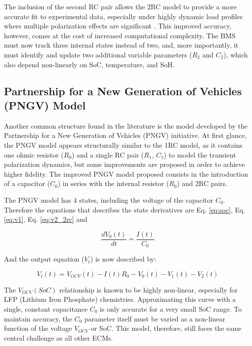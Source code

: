 \documentclass[lettersize,journal]{IEEEtran}
\begin{document}
The inclusion of the second RC pair allows the 2RC model to provide a more accurate fit to experimental data, especially under highly dynamic load profiles where multiple polarization effects are significant \cite{khalfi2021electric}. This improved accuracy, however, comes at the cost of increased computational complexity. The BMS must now track three internal states instead of two, and, more importantly, it must identify and update two additional variable parameters ($R_2$ and $C_2$), which also depend non-linearly on SoC, temperature, and SoH.

\subsection{Partnership for a New Generation of Vehicles (PNGV) Model}

Another common structure found in the literature is the model developed by the Partnership for a New Generation of Vehicles (PNGV) initiative\cite{tekin2024comparative}. At first glance, the PNGV model appears structurally similar to the 1RC model, as it contains one ohmic resistor ($R_0$) and a single RC pair ($R_1$, $C_1$) to model the transient polarization dynamics, but some improvements are proposed in order to achieve higher fidelity\cite{Tao2023,Xinyu2025}. The improved PNGV model proposed consists in the introduction of a capacitor ($C_0$) in series with the internal resistor ($R_0$) and 2RC pairs. 

The PNGV model has 4 states, including the voltage of the capacitor $C_0$. Therefore the equations that describes the state derivatives are Eq. \ref{eq:soc}, Eq. \ref{eq:v1}, Eq. \ref{eq:v2_2rc} and

\begin{equation}
	\label{eq:v0_pngv}
	\frac{dV_0(t)}{dt} =  \frac{I(t)}{C_0}
\end{equation}

And the output equation ($V_t$) is now described by:

\begin{equation}
	\label{eq:vt_pngv}
	V_t(t) = V_{OCV}(t) - I(t)R_0 - V_0(t)-V_1(t)-V_2(t)
\end{equation}

The $V_{OCV}(SoC)$ relationship is known to be highly non-linear, especially for LFP (Lithium Iron Phosphate) chemistries. Approximating this curve with a single, constant capacitance $C_0$ is only accurate for a very small SoC range. To maintain accuracy, the $C_0$ parameter itself must be varied as a non-linear function of the voltage $V_{OCV}$ or SoC\cite{tekin2024comparative}. This model, therefore, still faces the same central challenge as all other ECMs.
\end{document}
